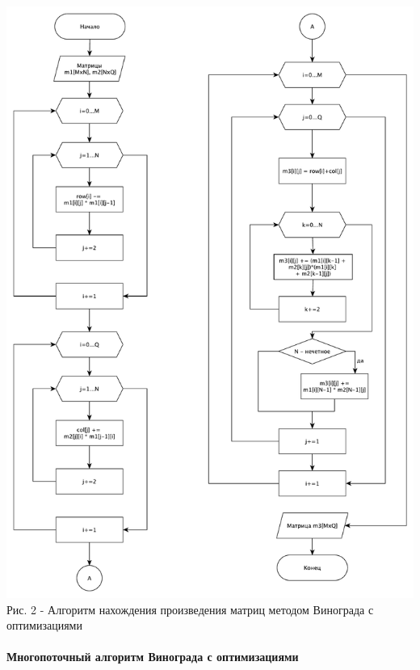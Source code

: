 \documentclass[a4paper,14pt]{article} %
\begin{document}
	\begin{center}
        		\includegraphics[scale = 0.53]{shema1} \\ Рис. 2 - Алгоритм нахождения произведения матриц методом Винограда с оптимизациями
	\end{center}
	
	\paragraph{Многопоточный алгоритм Винограда с оптимизациями}
	
\end{document}
